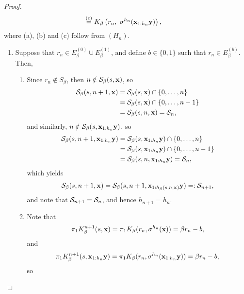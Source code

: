 \begin{proof}
\begin{align}
        &\overset{(c)}{=} K_\beta\left(r_n, \ \sigma^{h_n}(\xf_{1:h_n}\yf)\right),
    \end{align}
    where (a), (b) and (c) follow from $(H_n)$.
    \begin{enumerate}[label = (\alph*)]
        \item Suppose that $r_n \in E_\beta^{(0)} \cup E_\beta^{(1)}$, and define $b \in \{0,1\}$ such that $r_n \in E_\beta^{(b)}$. Then, 
            \begin{enumerate}[label=(\roman*)]
                \item Since $r_n \notin S_\beta$, then $n \notin \mathcal{S}_\beta(s,{\bf x})$, so
                \begin{align}
                    \mathcal{S}_\beta(s,n+1,{\bf x}) &= \mathcal{S}_\beta(s,{\bf x}) \cap \{0, \ldots, n\}\\
                    & =  \mathcal{S}_\beta(s,{\bf x}) \cap \{0, \ldots, n-1\}\\
                    & = \mathcal{S}_\beta(s,n,{\bf x}) = \mathcal{S}_n,
                \end{align}
                and similarly, $n \notin \mathcal{S}_\beta(s,{\bf x}_{1:h_n}{\bf y})$, so
                \begin{align}
                    \mathcal{S}_\beta(s,n+1,{\bf x}_{1:h_n}{\bf y}) &= \mathcal{S}_\beta(s,{\bf x}_{1:h_n}{\bf y}) \cap \{0, \ldots, n\}\\
                    & =  \mathcal{S}_\beta(s,{\bf x}_{1:h_n}{\bf y}) \cap \{0, \ldots, n-1\}\\
                    & = \mathcal{S}_\beta(s,n,{\bf x}_{1:h_n}{\bf y}) = \mathcal{S}_n,
                \end{align}
                which yields
                \begin{equation}
                    \mathcal{S}_\beta(s,n+1,{\bf x}) = \mathcal{S}_\beta(s,n+1,{\bf x}_{1:h_\beta(s,n,{\bf x})}{\bf y}) =: \mathcal{S}_{n+1},
                \end{equation}
                and note that $\mathcal{S}_{n+1} = \mathcal{S}_n$, and hence $h_{n+1} = h_n$.
                \item Note that
                \begin{equation}
                    \pi_1 K_\beta^{n+1}(s,{\bf x}) = \pi_1 K_\beta(r_n, \sigma^{h_n}({\bf x})) = \beta r_n - b,
                \end{equation}
                and 
                \begin{align}
                    \pi_1 K_\beta^{n+1}(s,{\bf x}_{1:h_n}{\bf y}) = \pi_1 K_\beta(r_n, \sigma^{h_n}({\bf x}_{1:h_n}{\bf y})) = \beta r_n - b,
                \end{align}
                so 

\end{enumerate}
\end{enumerate}
\end{proof}
